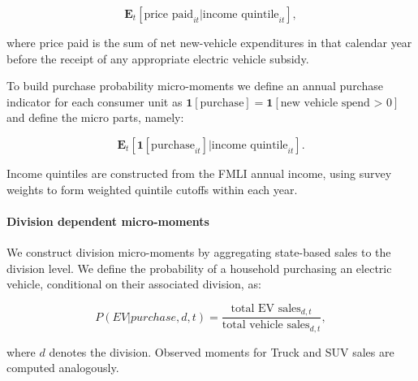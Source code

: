 \documentclass[11pt]{article}
\begin{document}
\[
\mathbf{E}_t[\text{price paid}_{it} | \text{income quintile}_{it}],
\]

\noindent where price paid is the sum of net new-vehicle expenditures in that calendar year before the receipt of any appropriate electric vehicle subsidy.

To build purchase probability micro-moments we define an annual purchase indicator for each consumer unit as $\mathbf{1}[\text{purchase}] = \mathbf{1}[{\text{new vehicle spend >  0}}]$ and define the micro parts, namely:

\[
\mathbf{E}_t[\mathbf{1}[\text{purchase}_{it}]| \text{income quintile}_{it}].
\]

Income quintiles are constructed from the FMLI annual income, using survey weights to form weighted quintile cutoffs within each year.

\paragraph{Division dependent micro-moments}

We construct division micro-moments by aggregating state-based sales to the division level. We define the probability of a household purchasing an electric vehicle, conditional on their associated division, as:

\[
P(EV | purchase, d, t) = \frac{\text{total EV sales}_{d,t}}{\text{total vehicle sales}_{d,t}},
\]

\noindent where $d$ denotes the division. Observed moments for Truck and SUV sales are computed analogously.
\end{document}

